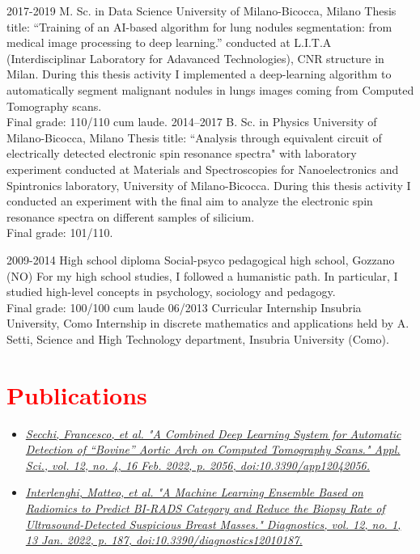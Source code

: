 \documentclass[a4paper]{friggeri-cv}
\begin{document}
\begin{entrylist}
  \entry
    {2017-2019}
    {M. Sc. in Data Science}
    {University of Milano-Bicocca, Milano}
    {Thesis title: ``Training of an AI-based algorithm for lung nodules segmentation: from medical image processing to deep learning.'' conducted at L.I.T.A (Interdisciplinar Laboratory for Adavanced Technologies), CNR structure in Milan. During this thesis activity I implemented a deep-learning algorithm to automatically segment malignant nodules in lungs images coming from Computed Tomography scans.\\
    Final grade: 110/110 cum laude.}
  \entry
    {2014–2017}
    {B. Sc. in Physics}
    {University of Milano-Bicocca, Milano}
    {Thesis title: ``Analysis through equivalent circuit of electrically detected electronic spin resonance spectra" with laboratory experiment conducted at Materials and Spectroscopies for Nanoelectronics and Spintronics laboratory, University of Milano-Bicocca. During this thesis activity I conducted an experiment with the final aim to analyze the electronic spin resonance spectra on different samples of silicium.\\
    Final grade: 101/110. }
\end{entrylist}
\clearpage
\begin{entrylist}
  \entry
    {2009-2014}
    {High school diploma}
    {Social-psyco pedagogical high school, Gozzano (NO)}
    {For my high school studies, I followed a humanistic path. In particular, I studied high-level concepts in psychology, sociology and pedagogy.\\
    Final grade: 100/100 cum laude}
  \entry
    {06/2013}
    {Curricular Internship}
    {Insubria University, Como}
    {Internship in discrete mathematics and applications held by A. Setti, Science and High Technology department, Insubria University (Como).}
\end{entrylist}

\section{\textcolor{red}{Publications}}
\begin{itemize}
	\item \href{https://www.mdpi.com/2076-3417/12/4/2056/htm}{\textit{Secchi, Francesco, et al. "A Combined Deep Learning System for Automatic Detection of “Bovine” Aortic Arch on Computed Tomography Scans." Appl. Sci., vol. 12, no. 4, 16 Feb. 2022, p. 2056, doi:10.3390/app12042056.}}
	\item \href{https://www.mdpi.com/2075-4418/12/1/187/htm}{\textit{Interlenghi, Matteo, et al. "A Machine Learning Ensemble Based on Radiomics to Predict BI-RADS Category and Reduce the Biopsy Rate of Ultrasound-Detected Suspicious Breast Masses." Diagnostics, vol. 12, no. 1, 13 Jan. 2022, p. 187, doi:10.3390/diagnostics12010187.}}
\end{itemize}
\end{document}

